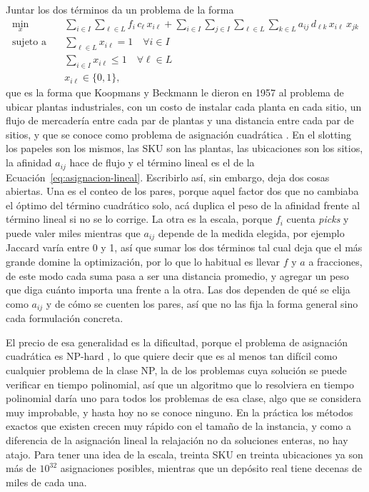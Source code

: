 Juntar los dos términos da un problema de la forma
\begin{equation}
    \begin{aligned}
        \min_{x} \quad & \sum_{i \in I} \sum_{\ell \in L} f_i\, c_\ell\, x_{i\ell} + \sum_{i \in I} \sum_{j \in I} \sum_{\ell \in L} \sum_{k \in L} a_{ij}\, d_{\ell k}\, x_{i\ell}\, x_{jk} \\
        \text{sujeto a} \quad & \sum_{\ell \in L} x_{i\ell} = 1 \quad \forall i \in I \\
        & \sum_{i \in I} x_{i\ell} \le 1 \quad \forall \ell \in L \\
        & x_{i\ell} \in \{0, 1\},
    \end{aligned}
    \label{eq:qap}
\end{equation}
que es la forma que Koopmans y Beckmann le dieron en 1957 al problema de ubicar plantas industriales, con un costo de instalar cada planta en cada sitio, un flujo de mercadería entre cada par de plantas y una distancia entre cada par de sitios, y que se conoce como problema de asignación cuadrática \citep{koopmans1957assignment}.
En el slotting los papeles son los mismos, las SKU son las plantas, las ubicaciones son los sitios, la afinidad $a_{ij}$ hace de flujo y el término lineal es el de la Ecuación~\ref{eq:asignacion-lineal}.
Escribirlo así, sin embargo, deja dos cosas abiertas.
Una es el conteo de los pares, porque aquel factor dos que no cambiaba el óptimo del término cuadrático solo, acá duplica el peso de la afinidad frente al término lineal si no se lo corrige.
La otra es la escala, porque $f_i$ cuenta \emph{picks} y puede valer miles mientras que $a_{ij}$ depende de la medida elegida, por ejemplo Jaccard varía entre 0 y 1, así que sumar los dos términos tal cual deja que el más grande domine la optimización, por lo que lo habitual es llevar $f$ y $a$ a fracciones, de este modo cada suma pasa a ser una distancia promedio, y agregar un peso que diga cuánto importa una frente a la otra.
Las dos dependen de qué se elija como $a_{ij}$ y de cómo se cuenten los pares, así que no las fija la forma general sino cada formulación concreta.

El precio de esa generalidad es la dificultad, porque el problema de asignación cuadrática es NP-hard \citep{sahni1976pcomplete}, lo que quiere decir que es al menos tan difícil como cualquier problema de la clase NP, la de los problemas cuya solución se puede verificar en tiempo polinomial, así que un algoritmo que lo resolviera en tiempo polinomial daría uno para todos los problemas de esa clase, algo que se considera muy improbable, y hasta hoy no se conoce ninguno.
En la práctica los métodos exactos que existen crecen muy rápido con el tamaño de la instancia, y como a diferencia de la asignación lineal la relajación no da soluciones enteras, no hay atajo.
Para tener una idea de la escala, treinta SKU en treinta ubicaciones ya son más de $10^{32}$ asignaciones posibles, mientras que un depósito real tiene decenas de miles de cada una.

